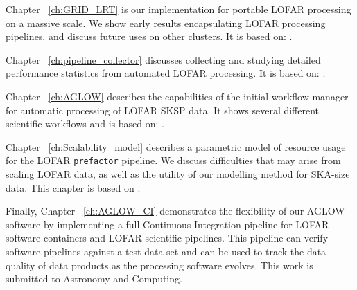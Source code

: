 Chapter ~\ref{ch:GRID_LRT} is our implementation for portable LOFAR processing on a massive scale. We show early results encapsulating LOFAR processing pipelines, and discuss future uses on other clusters. It is based on:  .

Chapter ~\ref{ch:pipeline_collector} discusses collecting and studying detailed performance statistics from automated LOFAR processing. It is based on: .

Chapter ~\ref{ch:AGLOW} describes the capabilities of the initial workflow manager for automatic processing of LOFAR SKSP data. It shows several different scientific workflows and is based on: .

Chapter ~\ref{ch:Scalability_model}  describes a parametric model of resource usage for the LOFAR \texttt{prefactor} pipeline. We discuss difficulties that may arise from scaling LOFAR data, as well as the utility of our modelling method for SKA-size data. This chapter is  based on .

Finally, Chapter ~\ref{ch:AGLOW_CI} demonstrates the flexibility of our AGLOW software by implementing a full Continuous Integration pipeline for LOFAR software containers and LOFAR scientific pipelines. This pipeline can verify software pipelines against a test data set and can be used to track the data quality of data products as the processing software evolves. This work is submitted to Astronomy and Computing. 

